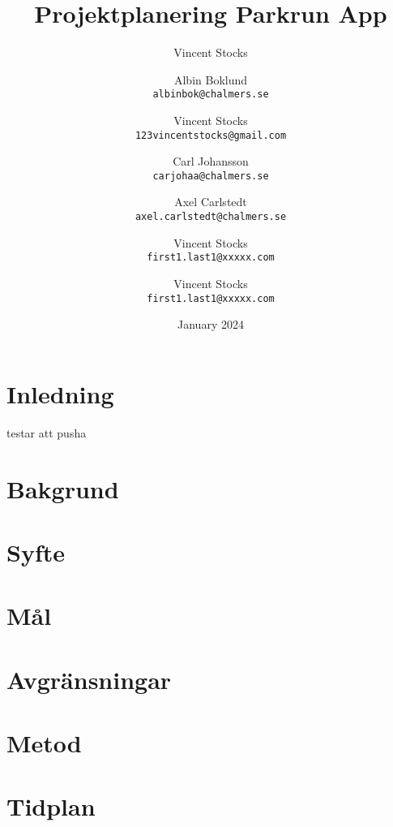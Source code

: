 \documentclass{article}
\title{Projektplanering Parkrun App}
\author{Vincent Stocks}
\author{
    Albin Boklund\\
    \texttt{albinbok@chalmers.se}
    \and
    Vincent Stocks\\
    \texttt{123vincentstocks@gmail.com}
    \and
    Carl Johansson\\
    \texttt{carjohaa@chalmers.se}
    \and
    Axel Carlstedt\\
    \texttt{axel.carlstedt@chalmers.se}
    \and
    Vincent Stocks\\
    \texttt{first1.last1@xxxxx.com}
    \and
    Vincent Stocks\\
    \texttt{first1.last1@xxxxx.com}
}
\date{January 2024}
\begin{document}
\maketitle

\newpage
\tableofcontents
\section{Inledning}
testar att pusha
\section{Bakgrund}
\section{Syfte}

\section{Mål}

\section{Avgränsningar}

\section{Metod}

\section{Tidplan}
\end{document}
